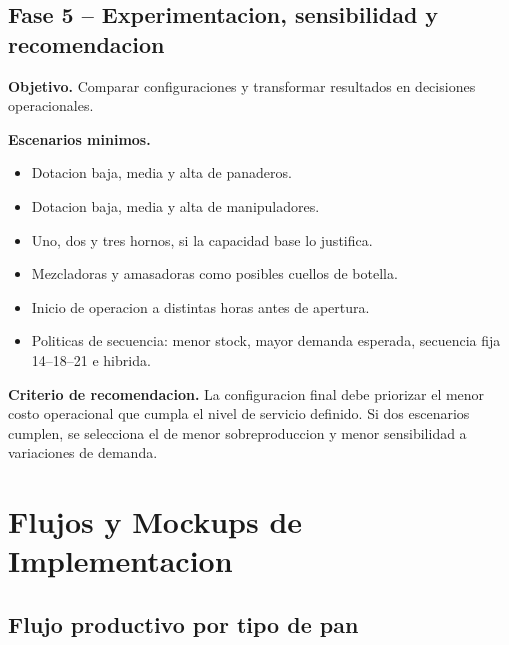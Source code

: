 \documentclass[12pt]{article}
\begin{document}
\subsection{Fase 5 -- Experimentacion, sensibilidad y recomendacion}

\textbf{Objetivo.} Comparar configuraciones y transformar resultados en decisiones operacionales.

\textbf{Escenarios minimos.}
\begin{itemize}
  \item Dotacion baja, media y alta de panaderos.
  \item Dotacion baja, media y alta de manipuladores.
  \item Uno, dos y tres hornos, si la capacidad base lo justifica.
  \item Mezcladoras y amasadoras como posibles cuellos de botella.
  \item Inicio de operacion a distintas horas antes de apertura.
  \item Politicas de secuencia: menor stock, mayor demanda esperada, secuencia fija 14--18--21 e hibrida.
\end{itemize}

\textbf{Criterio de recomendacion.} La configuracion final debe priorizar el menor costo operacional que cumpla el nivel de servicio definido. Si dos escenarios cumplen, se selecciona el de menor sobreproduccion y menor sensibilidad a variaciones de demanda.

\section{Flujos y Mockups de Implementacion}

\subsection{Flujo productivo por tipo de pan}
\end{document}
